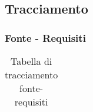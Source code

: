\newpage

\subsection{Tracciamento}

\subsubsection{Fonte - Requisiti}

\setlength{\tabcolsep}{10pt}
\begin{longtable}[h!] { >{\centering}m{5cm} >{\centering}m{5cm} }
	\caption{Tabella di tracciamento fonte-requisiti} \\
	\rowcolor{lightgray}
	\thead{Fonte} & \thead{Requisiti} \\ \endhead%
	

\end{longtable}

